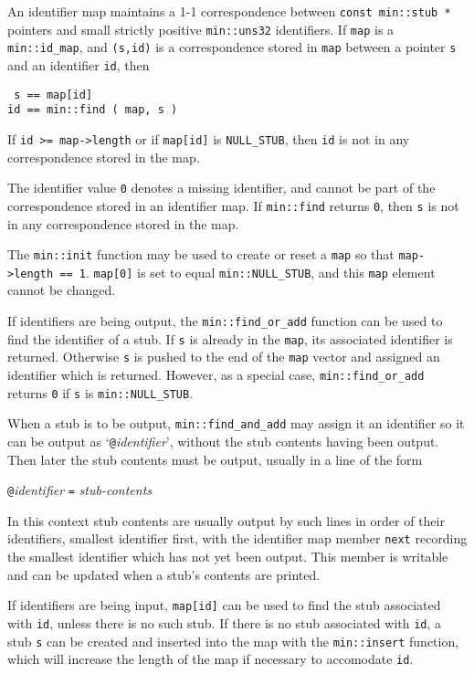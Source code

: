 \documentclass[12pt]{article}
\newcommand{\EOL}{\penalty \exhyphenpenalty}
\begin{document}
An identifier map maintains a 1-1 correspondence between
{\tt const min::\EOL stub~*}
pointers and small strictly positive {\tt min::\EOL uns32} identifiers.
If {\tt map} is a {\tt min::\EOL id\_\EOL map},
and {\tt (s,id)} is a correspondence stored in {\tt map} between
a pointer {\tt s} and an identifier {\tt id}, then
\begin{center}
\tt
s == map[id] \\
id == min::find ( map, s )
\end{center}

If {\tt id >= map->length} or if {\tt map[id]} is
{\tt NULL\_\EOL STUB}, then {\tt id} is not in any correspondence
stored in the map.

The identifier value {\tt 0} denotes a missing identifier,
and cannot be part of the
correspondence stored in an identifier map.
If {\tt min::\EOL find} returns {\tt 0}, then {\tt s} is not
in any correspondence stored in the map.


The {\tt min::init} function may be used to create or reset a {\tt map}
so that {\tt map->length == 1}.  {\tt map[0]} is set to equal
{\tt min::\EOL NULL\_\EOL STUB}, and this {\tt map} element cannot
be changed.

If identifiers are being output, the {\tt min::find\_\EOL or\_\EOL add}
function can be used to find the identifier of a stub.  If {\tt s} is already
in the {\tt map}, its associated identifier is returned.  Otherwise {\tt s}
is pushed to the end of the {\tt map} vector and assigned an identifier which
is returned.  However, as a special case,
{\tt min::\EOL find\_\EOL or\_\EOL add} returns
{\tt 0} if {\tt s} is {\tt min::\EOL NULL\_\EOL STUB}.

When a stub is to be output, {\tt min::\EOL find\_\EOL and\_\EOL add}
may assign it an identifier so it can be
output as `{\tt @}{\em identifier}', without the stub contents having been
output.  Then later the stub contents must be output, usually in a line of the
form
\begin{center}
{\tt @}{\em identifier} {\tt =} {\em stub-contents}
\end{center}
In this context stub contents are usually output by such lines in order of
their identifiers, smallest identifier first, with the identifier
map member {\tt next} recording the smallest identifier which has
not yet been output.  This member is writable and can be updated
when a stub's contents are printed.

If identifiers are being input, {\tt map[id]} can be used to find the stub
associated with {\tt id}, unless there is no such stub.
If there is no stub associated with {\tt id}, a stub {\tt s}
can be created and inserted into the map with the {\tt min::\EOL insert}
function, which will increase the length of the map if necessary to
accomodate {\tt id}.
\end{document}
